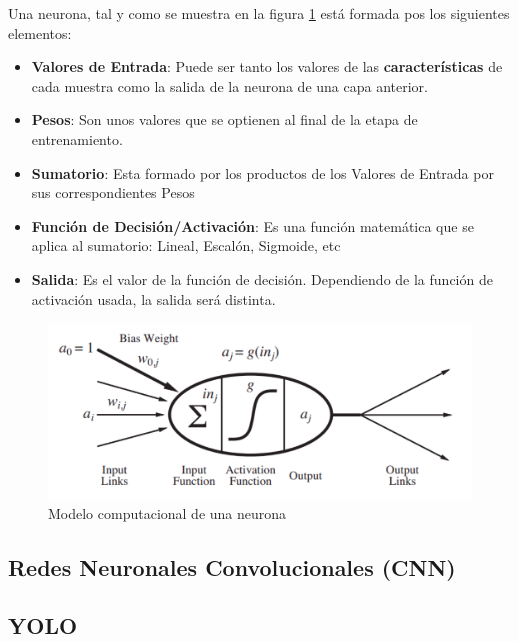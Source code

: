 Una neurona, tal y como se muestra en la figura \ref{fig:neurona} está formada pos los siguientes elementos:
\begin{itemize}
	\item \textbf{Valores de Entrada}: Puede ser tanto los valores de las \textbf{características} de cada muestra como la salida de la neurona de una capa anterior.
	\item \textbf{Pesos}: Son unos valores que se optienen al final de la etapa de entrenamiento.
	\item \textbf{Sumatorio}: Esta formado por los productos de los Valores de Entrada por sus correspondientes Pesos
	\item \textbf{Función de Decisión/Activación}: Es una función matemática que se aplica al sumatorio: Lineal, Escalón, Sigmoide, etc
	\item \textbf{Salida}: Es el valor de la función de decisión. Dependiendo de la función de activación usada, la salida será distinta.
\end{itemize}

\begin{figure} [h!]
  \begin{center}
    \includegraphics[width=15cm]{imagenes/neurona.png}
  \end{center}
  \caption[Modelo computacional de una neurona]{Modelo computacional de una neurona \cite{AIMA}}
  \label{fig:neurona}
\end{figure}


\subsection{Redes Neuronales Convolucionales (CNN)}
\label{subsec:redes_convolucionales}

\subsection{YOLO}
\label{subsec:yolo}

